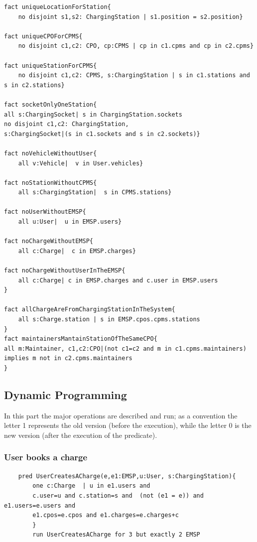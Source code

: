 \begin{verbatim}
fact uniqueLocationForStation{
	no disjoint s1,s2: ChargingStation | s1.position = s2.position}

fact uniqueCPOForCPMS{
	no disjoint c1,c2: CPO, cp:CPMS | cp in c1.cpms and cp in c2.cpms}

fact uniqueStationForCPMS{
	no disjoint c1,c2: CPMS, s:ChargingStation | s in c1.stations and s in c2.stations}

fact socketOnlyOneStation{
all s:ChargingSocket| s in ChargingStation.sockets
no disjoint c1,c2: ChargingStation, 
s:ChargingSocket|(s in c1.sockets and s in c2.sockets)}

fact noVehicleWithoutUser{
	all v:Vehicle|  v in User.vehicles}

fact noStationWithoutCPMS{
	all s:ChargingStation|  s in CPMS.stations}

fact noUserWithoutEMSP{
	all u:User|  u in EMSP.users}

fact noChargeWithoutEMSP{
	all c:Charge|  c in EMSP.charges}

fact noChargeWithoutUserInTheEMSP{
	all c:Charge| c in EMSP.charges and c.user in EMSP.users
}

fact allChargeAreFromChargingStationInTheSystem{
	all s:Charge.station | s in EMSP.cpos.cpms.stations 
}
fact maintainersMantainStationOfTheSameCPO{
all m:Maintainer, c1,c2:CPO|(not c1=c2 and m in c1.cpms.maintainers) 
implies m not in c2.cpms.maintainers 
}
\end{verbatim}

\subsection{Dynamic Programming}
In this part the major operations are described and run; as a convention the letter 1 represents the old version (before the execution), while the letter 0 is the new version (after the execution of the predicate).

\subsubsection{User books a charge}
\begin{verbatim}
    pred UserCreatesACharge(e,e1:EMSP,u:User, s:ChargingStation){
        one c:Charge  | u in e1.users and
        c.user=u and c.station=s and  (not (e1 = e)) and  e1.users=e.users and
        e1.cpos=e.cpos and e1.charges=e.charges+c
        }
        run UserCreatesACharge for 3 but exactly 2 EMSP    
\end{verbatim}

